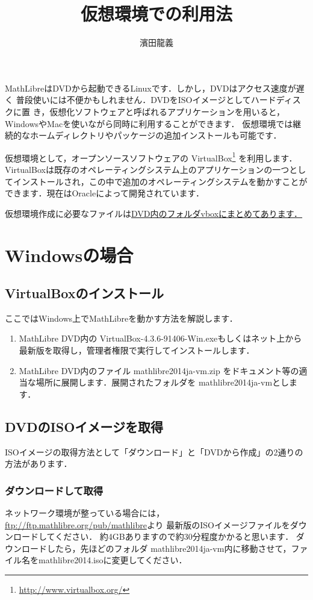 \documentclass[a4j]{jsarticle}
\title{仮想環境での利用法}
\author{濱田龍義}
\newcommand{\vboxwin}{VirtualBox-4.3.6-91406-Win.exe}
\newcommand{\vm}{mathlibre2014ja-vm}
\begin{document}
\maketitle
MathLibreはDVDから起動できるLinuxです．しかし，DVDはアクセス速度が遅く
普段使いには不便かもしれません．DVDをISOイメージとしてハードディスクに置
き，仮想化ソフトウェアと呼ばれるアプリケーションを用いると，
WindowsやMacを使いながら同時に利用することができます．
仮想環境では継続的なホームディレクトリやパッケージの追加インストールも可能です．

仮想環境として，オープンソースソフトウェアの VirtualBox\footnote{\url{http://www.virtualbox.org/}} を利用します．
VirtualBoxは既存のオペレーティングシステム上のアプリケーションの一つとし
てインストールされ，この中で追加のオペレーティングシステムを動かすことが
できます．現在はOracleによって開発されています．

仮想環境作成に必要なファイルは\underline{DVD内のフォルダvboxにまとめてあります．}

\section{Windowsの場合}
\subsection{VirtualBoxのインストール}
ここではWindows上でMathLibreを動かす方法を解説します．
\begin{enumerate}
 \item MathLibre DVD内の \vboxwin もしくはネット上から最新版を取得し，管理者権限で実行してインストールします．
 \item MathLibre DVD内のファイル \vm.zip をドキュメント等の適当な場所に展開します．展開されたフォルダを \vm とします．
\end{enumerate}

\subsection{DVDのISOイメージを取得}
ISOイメージの取得方法として「ダウンロード」と「DVDから作成」の2通りの方法があります．
\subsubsection{ダウンロードして取得}
ネットワーク環境が整っている場合には，
\url{ftp://ftp.mathlibre.org/pub/mathlibre}より
最新版のISOイメージファイルをダウンロードしてください．
約4GBありますので約30分程度かかると思います．
ダウンロードしたら，先ほどのフォルダ \vm 内に移動させて，ファイル名をmathlibre2014.isoに変更してください．
\end{document}
